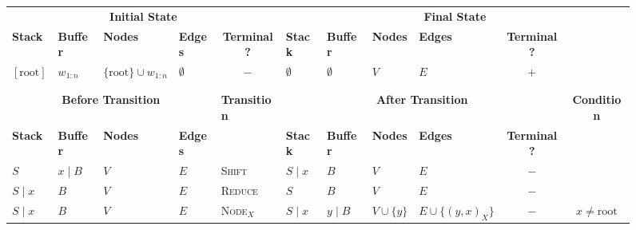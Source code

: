 \documentclass[11pt]{article}
\begin{document}
\begin{figure*}
\begin{adjustbox}{width=\textwidth,margin=3pt,frame}
\begin{tabular}{llll|l|llllc|c}
\multicolumn{5}{c|}{\textbf{\small Initial State}} & \multicolumn{6}{c}{\textbf{\small Final State}} \\
\textbf{\footnotesize Stack} & \textbf{\footnotesize Buffer} & \textbf{\footnotesize Nodes} & \multicolumn{1}{l}{\textbf{\footnotesize Edges}} & \multicolumn{1}{c|}{\textbf{\footnotesize Terminal?}} & \textbf{\footnotesize Stack} & \textbf{\footnotesize Buffer} & \textbf{\footnotesize Nodes} & \textbf{\footnotesize Edges} & \multicolumn{1}{c}{\textbf{\footnotesize Terminal?}} \\
$[\mathrm{root}]$ & $w_{1:n}$ & \multirow{2}{40pt}{$\{\mathrm{root}\} \cup w_{1:n}$} & \multicolumn{1}{l}{$\emptyset$} & \multicolumn{1}{c|}{$-$} & $\emptyset$ & $\emptyset$ & $V$ & $E$ & \multicolumn{1}{c}{$+$} \\ 
\multicolumn{5}{c|}{} \\
\multicolumn{5}{c|}{} \\
\hline
\multicolumn{4}{c|}{\textbf{\small Before Transition}} & \textbf{\small Transition} & \multicolumn{5}{c|}{\textbf{\small After Transition}} & \textbf{\small Condition} \\
\textbf{\footnotesize Stack} & \textbf{\footnotesize Buffer} & \textbf{\footnotesize Nodes} & \textbf{\footnotesize Edges} & & \textbf{\footnotesize Stack} & \textbf{\footnotesize Buffer} & \textbf{\footnotesize Nodes} & \textbf{\footnotesize Edges} & \textbf{\footnotesize Terminal?} & \\
$S$ & $x \;|\; B$ & $V$ & $E$ & \textsc{Shift} & $S \;|\; x$ & $B$ & $V$ & $E$ & $-$ & \\
$S \;|\; x$ & $B$ & $V$ & $E$ & \textsc{Reduce} & $S$ & $B$ & $V$ & $E$ & $-$ & \\
\cline{11-11}
$S \;|\; x$ & $B$ & $V$ & $E$ & \textsc{Node$_X$} & $S \;|\; x$ & $y \;|\; B$ & $V \cup \{ y \}$ & $E \cup \{ (y,x)_X \}$ & $-$ &
$x \neq \mathrm{root}$ \\
\cline{11-11}

\end{tabular}
\end{adjustbox}
\end{figure*}
\end{document}
